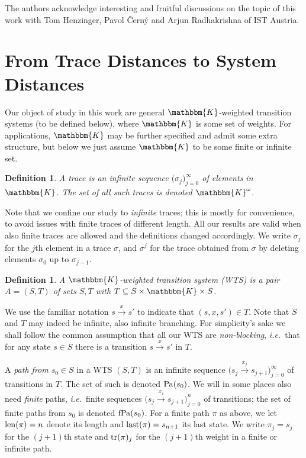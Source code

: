 \documentclass[copyright,creativecommons,sharealike]{eptcs}
\theoremstyle{plain}
\newtheorem{definition}[theorem]{Definition}
\renewcommand*\K{\mathbbm{K}}
\newcommand*\tto[1]{\xrightarrow{#1}}
\newcommand*\ie{\textit{i.e.}}
\newcommand*\last{\textup{last}} \newcommand{\Round}[1]{\ensuremath{\textup{Round}_{(#1)}}\xspace}
\begin{document}
The authors acknowledge interesting and fruitful discussions on the
topic of this work with Tom Henzinger, Pavol {\v C}ern{\'y} and Arjun
Radhakrishna of IST Austria.

\section{From Trace Distances to System Distances}

Our object of study in this work are general $\K$-weighted transition
systems (to be defined below), where $\K$ is some set of weights.  For
applications, $\K$ may be further specified and admit some extra
structure, but below we just assume $\K$ to be some finite or infinite
set.

\begin{definition}
  A \emph{trace} is an infinite sequence $\big( \sigma_j\big)_{ j=
    0}^\infty$ of elements in $\K$.  The set of all such traces is
  denoted $\K^\omega$.
\end{definition}

Note that we confine our study to \emph{infinite} traces; this is
mostly for convenience, to avoid issues with finite traces of
different length.  All our results are valid when also finite traces
are allowed and the definitions changed accordingly.  We write
$\sigma_j$ for the $j$th element in a trace $\sigma$, and $\sigma^j$
for the trace obtained from $\sigma$ by deleting elements $\sigma_0$
up to $\sigma_{ j- 1}$.

\begin{definition}
  A \emph{$\K$-weighted transition system} (WTS) is a pair $A=( S, T)$
  of sets $S, T$ with $T\subseteq S\times \K\times S$.
\end{definition}

We use the familiar notation $s\tto x s'$ to indicate that $( s, x,
s')\in T$.  Note that $S$ and $T$ may indeed be infinite, also
infinite branching.  For simplicity's sake we shall follow the common
assumption that all our WTS are \emph{non-blocking}, \ie~that for any
state $s\in S$ there is a transition $s\tto x s'$ in $T$.

A \emph{path from $s_0\in S$} in a WTS $( S, T)$ is an infinite
sequence $\big( s_j\tto{ x_j} s_{ j+ 1}\big)_{j= 0}^\infty$ of
transitions in $T$.  The set of such is denoted $\operatorname{Pa}( s_0)$.  We will
in some places also need \emph{finite} paths, \ie~finite sequences
$\big( s_j\tto{ x_j} s_{ j+ 1}\big)_{j= 0}^n$ of transitions; the set
of finite paths from $s_0$ is denoted $\operatorname{fPa}( s_0)$.  For a finite path
$\pi$ as above, we let $\operatorname{len}( \pi)= n$ denote its length and $\last(
\pi)= s_{ n+ 1}$ its last state.  We write $\pi_j= s_j$ for the $( j+
1)$th state and $\operatorname{tr}( \pi)_j$ for the $( j+ 1)$th weight in a finite
or infinite path.
\end{document}
